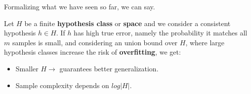 Formalizing what we have seen so far, we can say.
\begin{definition}
    Let $H$ be a finite \textbf{hypothesis class} or \textbf{space} and we consider a consistent hypothesis $h \in H$. If $h$ has high true error, namely the 
    probability it matches all $m$ samples is small, and considering an union bound over $H$, where large hypothesis classes increase the risk of 
    \textbf{overfitting}, we get:
    \begin{itemize}
        \renewcommand{\labelitemi}{-}
        \item Smaller $H \rightarrow$ guarantees better generalization.
        \item Sample complexity depends on $log|H|$.
    \end{itemize}
\end{definition}
